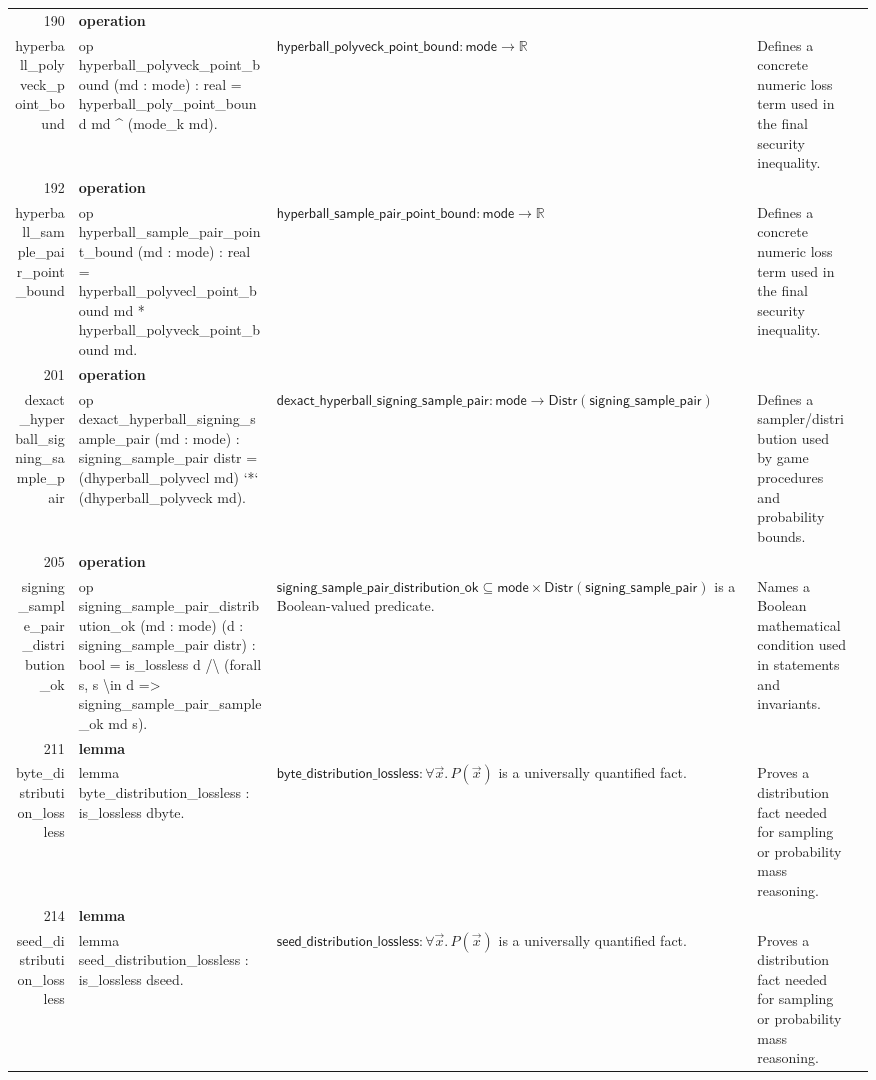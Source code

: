 \documentclass[10pt]{article}
\newcommand{\ec}[1]{\begingroup\ttfamily\scriptsize #1\endgroup}
\begin{document}
\begin{longtable}{r L{0.17\textwidth} L{0.26\textwidth} L{0.27\textwidth} L{0.20\textwidth}}
190 & \textbf{operation}\\\ec{hyperball\_polyveck\_point\_bound} & \ec{op hyperball\_polyveck\_point\_bound (md : mode) : real = hyperball\_poly\_point\_bound md \textasciicircum{} (mode\_k md).} & \(\mathsf{hyperball\_polyveck\_point\_bound} : \mathsf{mode} \to \mathbb{R}\) & Defines a concrete numeric loss term used in the final security inequality. \\
192 & \textbf{operation}\\\ec{hyperball\_sample\_pair\_point\_bound} & \ec{op hyperball\_sample\_pair\_point\_bound (md : mode) : real = hyperball\_polyvecl\_point\_bound md * hyperball\_polyveck\_point\_bound md.} & \(\mathsf{hyperball\_sample\_pair\_point\_bound} : \mathsf{mode} \to \mathbb{R}\) & Defines a concrete numeric loss term used in the final security inequality. \\
201 & \textbf{operation}\\\ec{dexact\_hyperball\_signing\_sample\_pair} & \ec{op dexact\_hyperball\_signing\_sample\_pair (md : mode) : signing\_sample\_pair distr = (dhyperball\_polyvecl md) `*` (dhyperball\_polyveck md).} & \(\mathsf{dexact\_hyperball\_signing\_sample\_pair} : \mathsf{mode} \to \mathsf{Distr}(\mathsf{signing\_sample\_pair})\) & Defines a sampler/distribution used by game procedures and probability bounds. \\
205 & \textbf{operation}\\\ec{signing\_sample\_pair\_distribution\_ok} & \ec{op signing\_sample\_pair\_distribution\_ok (md : mode) (d : signing\_sample\_pair distr) : bool = is\_lossless d /\textbackslash{} (forall s, s \textbackslash{}in d => signing\_sample\_pair\_sample\_ok md s).} & \(\mathsf{signing\_sample\_pair\_distribution\_ok} \subseteq \mathsf{mode} \times \mathsf{Distr}(\mathsf{signing\_sample\_pair})\) is a Boolean-valued predicate. & Names a Boolean mathematical condition used in statements and invariants. \\
211 & \textbf{lemma}\\\ec{byte\_distribution\_lossless} & \ec{lemma byte\_distribution\_lossless : is\_lossless dbyte.} & \(\mathsf{byte\_distribution\_lossless} : \forall \vec{x}.\, P(\vec{x})\) is a universally quantified fact. & Proves a distribution fact needed for sampling or probability mass reasoning. \\
214 & \textbf{lemma}\\\ec{seed\_distribution\_lossless} & \ec{lemma seed\_distribution\_lossless : is\_lossless dseed.} & \(\mathsf{seed\_distribution\_lossless} : \forall \vec{x}.\, P(\vec{x})\) is a universally quantified fact. & Proves a distribution fact needed for sampling or probability mass reasoning. \\

\end{longtable}
\end{document}
